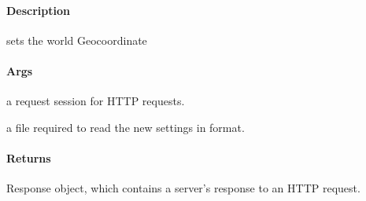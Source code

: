 \documentclass[letterpaper,10pt,english]{sphinxmanual}
\begin{document}
\begin{fulllineitems}
\label{\detokenize{gemini_lidar_hub_API:gemini_lidar_hub_API.set_lidar_hub_world_coordinates}}
\pysigstartsignatures
{}
\pysigstopsignatures

\paragraph{Description}
\label{\detokenize{gemini_lidar_hub_API:id47}}
\sphinxAtStartPar
sets the world Geo\sphinxhyphen{}coordinate


\paragraph{Args}
\label{\detokenize{gemini_lidar_hub_API:id48}}\begin{description}
\sphinxAtStartPar
a request session for HTTP requests.

\sphinxAtStartPar
a file required to read the new settings in  format.

\end{description}


\paragraph{Returns}
\label{\detokenize{gemini_lidar_hub_API:id49}}\begin{description}
\sphinxAtStartPar
Response object, which contains a server’s response to an HTTP request.

\end{description}

\end{fulllineitems}

\end{document}
